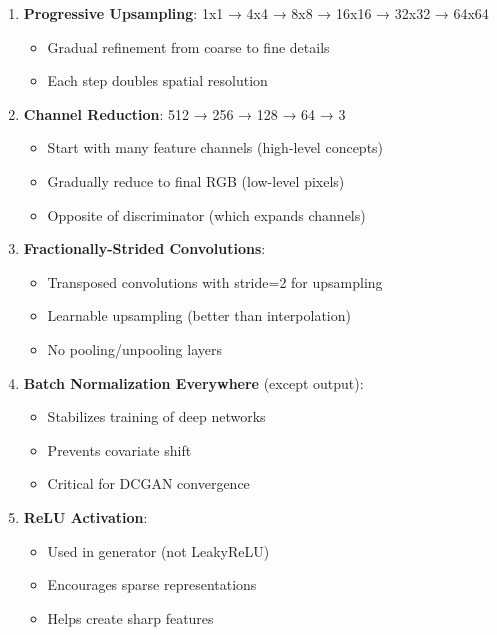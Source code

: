 \documentclass[11pt]{article}
\providecommand{\tightlist}{%
      \setlength{\itemsep}{0pt}\setlength{\parskip}{0pt}}
\begin{document}
\begin{enumerate}
\def\labelenumi{\arabic{enumi}.}
\tightlist
\item
  \textbf{Progressive Upsampling}: 1x1 → 4x4 → 8x8 → 16x16 → 32x32 →
  64x64

  \begin{itemize}
  \tightlist
  \item
    Gradual refinement from coarse to fine details
  \item
    Each step doubles spatial resolution
  \end{itemize}
\item
  \textbf{Channel Reduction}: 512 → 256 → 128 → 64 → 3

  \begin{itemize}
  \tightlist
  \item
    Start with many feature channels (high-level concepts)
  \item
    Gradually reduce to final RGB (low-level pixels)
  \item
    Opposite of discriminator (which expands channels)
  \end{itemize}
\item
  \textbf{Fractionally-Strided Convolutions}:

  \begin{itemize}
  \tightlist
  \item
    Transposed convolutions with stride=2 for upsampling
  \item
    Learnable upsampling (better than interpolation)
  \item
    No pooling/unpooling layers
  \end{itemize}
\item
  \textbf{Batch Normalization Everywhere} (except output):

  \begin{itemize}
  \tightlist
  \item
    Stabilizes training of deep networks
  \item
    Prevents covariate shift
  \item
    Critical for DCGAN convergence
  \end{itemize}
\item
  \textbf{ReLU Activation}:

  \begin{itemize}
  \tightlist
  \item
    Used in generator (not LeakyReLU)
  \item
    Encourages sparse representations
  \item
    Helps create sharp features
  \end{itemize}
\end{enumerate}
\end{document}
